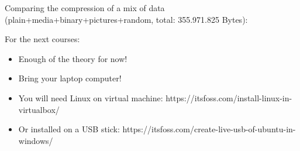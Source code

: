 \documentclass[handout]{beamer}[10pt, usepdftitle=false]
\begin{document}
		
	\begin{frame}
	
	Comparing the compression of a mix of data (plain+media+binary+pictures+random, total: 355.971.825 Bytes):
	\vspace*{0.6em}	
	
	\begin{center}
	\end{center}	

	\end{frame}
	
	\begin{frame}
	
	For the next courses:
	
	\begin{itemize}
		\item{Enough of the theory for now!}
		\item{Bring your laptop computer!}
		\item{You will need Linux on virtual machine: https://itsfoss.com/install-linux-in-virtualbox/}
		\item{Or installed on a USB stick: https://itsfoss.com/create-live-usb-of-ubuntu-in-windows/}		
	\end{itemize}
	\end{frame}	
	
\end{document}
